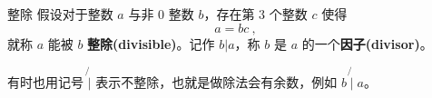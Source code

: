 
\begin{definition}{整除}
假设对于整数 $a$ 与非 $0$ 整数 $b$，存在第 $3$ 个整数 $c$ 使得
\begin{equation}
a = bc ~,
\end{equation}
就称 $a$ 能被 $b$ \textbf{整除(divisible)}。记作 $b | a$，称 $b$ 是 $a$ 的一个\textbf{因子(divisor)}。
\end{definition}

有时也用记号 $\not{|}$ 表示不整除，也就是做除法会有余数，例如 $b \not{\mid} a$。

